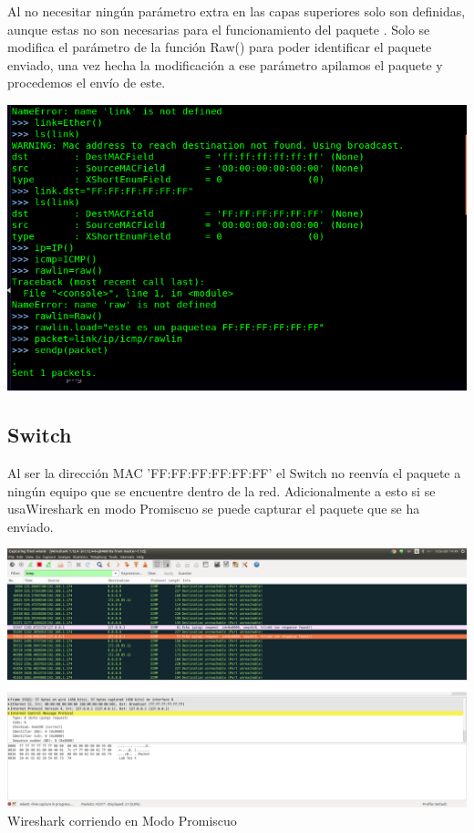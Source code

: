 \documentclass[spanish]{udpreport}
\begin{document}
Al no necesitar ningún parámetro extra en las capas superiores solo son definidas, aunque estas no son necesarias para el funcionamiento del paquete . Solo se modifica el parámetro de la función Raw() para poder identificar el paquete enviado, una vez hecha la modificación a ese parámetro apilamos el paquete y procedemos el envío de este.

\begin{center}
	\includegraphics[scale=.37]{imagenes/Switch/Test_1b.png}
\end{center}

\pagebreak

\subsection{Switch}

Al ser la dirección MAC 'FF:FF:FF:FF:FF:FF' el Switch no reenvía el paquete a ningún equipo que se encuentre dentro de la red. Adicionalmente a esto si se usaWireshark en modo Promiscuo se puede capturar el paquete que se ha enviado.

\begin{center}
	\includegraphics[scale=.21]{imagenes/Switch/FF.png}
	\\ Wireshark corriendo en Modo Promiscuo
\end{center}
\end{document}
